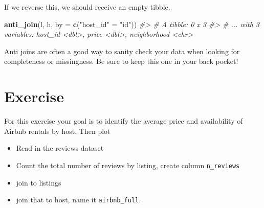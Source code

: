 \documentclass[
]{book}
\newenvironment{Shaded}{\begin{snugshade}}{\end{snugshade}}
\newcommand{\CommentTok}[1]{\textcolor[rgb]{0.56,0.35,0.01}{\textit{#1}}}
\newcommand{\DataTypeTok}[1]{\textcolor[rgb]{0.13,0.29,0.53}{#1}}
\newcommand{\KeywordTok}[1]{\textcolor[rgb]{0.13,0.29,0.53}{\textbf{#1}}}
\newcommand{\NormalTok}[1]{#1}
\newcommand{\StringTok}[1]{\textcolor[rgb]{0.31,0.60,0.02}{#1}}
\providecommand{\tightlist}{%
  \setlength{\itemsep}{0pt}\setlength{\parskip}{0pt}}
\begin{document}
If we reverse this, we should receive an empty tibble.

\begin{Shaded}
\begin{Highlighting}[]
\KeywordTok{anti\_join}\NormalTok{(l, h, }\DataTypeTok{by =} \KeywordTok{c}\NormalTok{(}\StringTok{"host\_id"}\NormalTok{ =}\StringTok{ "id"}\NormalTok{))}
\CommentTok{\#\textgreater{} \# A tibble: 0 x 3}
\CommentTok{\#\textgreater{} \# ... with 3 variables: host\_id \textless{}dbl\textgreater{}, price \textless{}dbl\textgreater{}, neighborhood \textless{}chr\textgreater{}}
\end{Highlighting}
\end{Shaded}

Anti joins are often a good way to sanity check your data when looking for completeness or missingness. Be sure to keep this one in your back pocket!

\hypertarget{exercise-2}{%
\section{Exercise}\label{exercise-2}}

For this exercise your goal is to identify the average price and availability of Airbnb rentals by host. Then plot

\begin{itemize}
\tightlist
\item
  Read in the reviews dataset
\item
  Count the total number of reviews by listing, create column \texttt{n\_reviews}
\item
  join to listings
\item
  join that to host, name it \texttt{airbnb\_full}.
\end{itemize}
\end{document}

